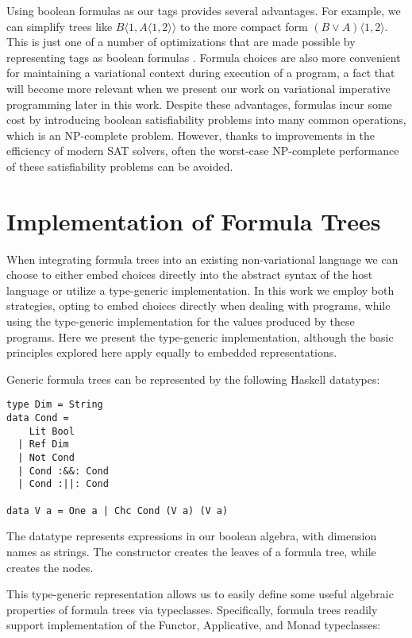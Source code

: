 \documentclass[12pt,oneside]{book}
\newcommand{\tagtree}[3]{#1 \langle #2, #3 \rangle}
\begin{document}
Using boolean formulas as our tags provides several advantages. For example, we can simplify trees like
$\tagtree{B}{1}{\tagtree{A}{1}{2}}$ to the more compact form $\tagtree{(B \vee A)}{1}{2}$. This is just
one of a number of optimizations that are made possible by representing tags as boolean formulas
\cite{walkingshaw2014projectional,hubbard2016formula}. Formula choices are also more convenient
for maintaining a variational context during execution of a program, a fact that will become
more relevant when we present our work on variational imperative programming later in
this work. Despite these advantages, formulas incur some cost by introducing boolean
satisfiability problems into many common operations, which is an NP-complete problem. However, thanks to improvements in the
efficiency of modern SAT solvers, often the worst-case NP-complete performance of these satisfiability
problems can be avoided.

\section{Implementation of Formula Trees}

When integrating formula trees into an existing non-variational language we can choose to
either embed choices directly into the abstract syntax of the host language or utilize a type-generic
implementation. In this work we employ both strategies, opting to embed choices directly when dealing
with programs, while using the type-generic implementation for the values produced by these programs.
Here we present the type-generic implementation, although the basic principles explored here apply
equally to embedded representations.

Generic formula trees can be represented by the following Haskell datatypes:

\begin{lstlisting}
type Dim = String
data Cond =
    Lit Bool
  | Ref Dim
  | Not Cond
  | Cond :&&: Cond
  | Cond :||: Cond

data V a = One a | Chc Cond (V a) (V a)
\end{lstlisting}

The datatype  represents expressions in our boolean algebra, with dimension names as strings.
The constructor  creates the leaves of a formula tree, while  creates the nodes.

This type-generic representation allows us to easily define some useful algebraic properties of
formula trees via typeclasses. Specifically, formula trees readily support implementation of the
Functor, Applicative, and Monad typeclasses:
\end{document}
